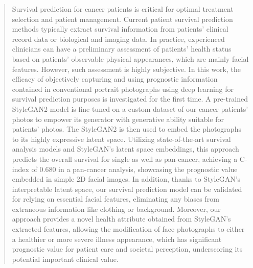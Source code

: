 \documentclass[runningheads]{llncs}
\begin{document}
\begin{abstract}
Survival prediction for cancer patients is critical for optimal treatment selection and patient management. Current patient survival prediction methods typically extract survival information from patients' clinical record data or biological and imaging data. In practice, experienced clinicians can have a preliminary assessment of patients' health status based on patients' observable physical appearances, which are mainly facial features. However, such assessment is highly subjective. 
In this work, the efficacy of objectively capturing and using prognostic information contained in conventional portrait photographs using deep learning for survival prediction purposes is investigated for the first time.
A pre-trained StyleGAN2 model is fine-tuned on a custom dataset of our cancer patients' photos to empower its generator with generative ability suitable for patients' photos. 
The StyleGAN2 is then used to embed the photographs to its highly expressive latent space.
Utilizing state-of-the-art survival analysis models and StyleGAN’s latent space embeddings, this approach predicts the overall survival for single as well as pan-cancer, achieving a C-index of $0.680$ in a pan-cancer analysis, showcasing the prognostic value embedded in simple 2D facial images.
In addition, thanks to StyleGAN's interpretable latent space, our survival prediction model can be validated for relying on essential facial features, eliminating any biases from extraneous information like clothing or background. 
Moreover, our approach provides a novel health attribute obtained from StyleGAN’s extracted features, allowing the modification of face photographs to either a healthier or more severe illness appearance, which has significant prognostic value for patient care and societal perception, underscoring its potential important clinical value.


\end{abstract}
%
%
%
\end{document}
